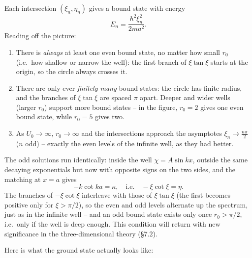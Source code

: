 \documentclass[a4paper]{scrartcl}
\begin{document}
Each intersection $(\xi_n, \eta_n)$ gives a bound state with energy
$$
E_n = \frac{\hbar^2 \xi_n^2}{2 m a^2}.
$$
Reading off the picture:
\begin{enumerate}[label=(\roman*)]
    \item There is \emph{always} at least one even bound state, no matter how small $r_0$ (i.e.\ how shallow or narrow the well): the first branch of $\xi \tan \xi$ starts at the origin, so the circle always crosses it.
    \item There are only ever \emph{finitely many} bound states: the circle has finite radius, and the branches of $\xi \tan \xi$ are spaced $\pi$ apart. Deeper and wider wells (larger $r_0$) support more bound states -- in the figure, $r_0 = 2$ gives one even bound state, while $r_0 = 5$ gives two.
    \item As $U_0 \rightarrow \infty$, $r_0 \rightarrow \infty$ and the intersections approach the asymptotes $\xi_n \rightarrow \frac{n\pi}{2}$ ($n$ odd) -- exactly the even levels of the infinite well, as they had better.
\end{enumerate}
The odd solutions run identically: inside the well $\chi = A \sin kx$, outside the same decaying exponentials but now with opposite signs on the two sides, and the matching at $x = a$ gives
$$
-k \cot ka = \kappa, \quad \text{i.e.} \quad -\xi \cot \xi = \eta.
$$
The branches of $-\xi\cot\xi$ interleave with those of $\xi \tan \xi$ (the first becomes positive only for $\xi > \pi/2$), so the even and odd levels alternate up the spectrum, just as in the infinite well -- and an odd bound state exists only once $r_0 > \pi/2$, i.e.\ only if the well is deep enough. This condition will return with new significance in the three-dimensional theory (\S 7.2).

Here is what the ground state actually looks like:
\end{document}
